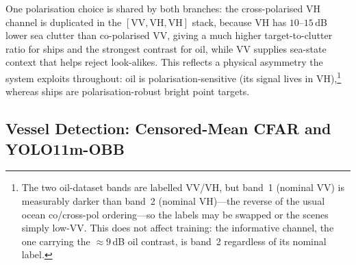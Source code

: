 \documentclass{ieeeaccess}
\begin{document}
One polarisation choice is shared by both branches: the cross-polarised VH channel is duplicated in the $[\text{VV},\text{VH},\text{VH}]$ stack, because VH has $10$--$15$\,dB lower sea clutter than co-polarised VV, giving a much higher target-to-clutter ratio for ships and the strongest contrast for oil, while VV supplies sea-state context that helps reject look-alikes. This reflects a physical asymmetry the system exploits throughout: oil is polarisation-sensitive (its signal lives in VH),\footnote{The two oil-dataset bands are labelled VV/VH, but band~1 (nominal VV) is measurably darker than band~2 (nominal VH)---the reverse of the usual ocean co/cross-pol ordering---so the labels may be swapped or the scenes simply low-VV. This does not affect training: the informative channel, the one carrying the $\approx\!9$\,dB oil contrast, is band~2 regardless of its nominal label.} whereas ships are polarisation-robust bright point targets.

\subsection{Vessel Detection: Censored-Mean CFAR and YOLO11m-OBB}
\label{subsec:ships}
\end{document}
